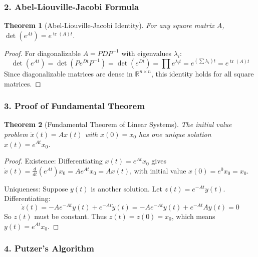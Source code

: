 \documentclass[12pt,a4paper,oneside]{article}
\theoremstyle{definition}
\theoremstyle{plain}
\newtheorem{theorem}{Theorem}[section]
\begin{document}
\subsubsection{2. Abel-Liouville-Jacobi Formula}

\vspace{0.15cm}
\begin{theorem}[Abel-Liouville-Jacobi Identity]
For any square matrix $A$, $\det(e^{At}) = e^{\operatorname{tr}(A) t}$.
\end{theorem}

\begin{proof}
For diagonalizable $A = P D P^{-1}$ with eigenvalues $\lambda_i$:
\begin{equation}
    \det(e^{At}) = \det(P e^{Dt} P^{-1}) = \det(e^{Dt}) = \prod e^{\lambda_i t} = e^{(\sum \lambda_i) t} = e^{\operatorname{tr}(A) t}
\end{equation}
Since diagonalizable matrices are dense in $\mathbb{R}^{n \times n}$, this identity holds for all square matrices.
\end{proof}

\subsubsection{3. Proof of Fundamental Theorem}

\vspace{0.15cm}
\begin{theorem}[Fundamental Theorem of Linear Systems]
The initial value problem $\dot{x}(t) = A x(t)$ with $x(0) = x_0$ has one unique solution $x(t) = e^{At} x_0$.
\end{theorem}

\begin{proof}
Existence: Differentiating $x(t) = e^{At} x_0$ gives $\dot{x}(t) = \frac{d}{dt}(e^{At}) x_0 = A e^{At} x_0 = A x(t)$, with initial value $x(0) = e^0 x_0 = x_0$.

Uniqueness: Suppose $y(t)$ is another solution. Let $z(t) = e^{-At} y(t)$. Differentiating:
\begin{equation}
    \dot{z}(t) = -A e^{-At} y(t) + e^{-At} \dot{y}(t) = -A e^{-At} y(t) + e^{-At} A y(t) = 0
\end{equation}
So $z(t)$ must be constant. Thus $z(t) = z(0) = x_0$, which means $y(t) = e^{At} x_0$.
\end{proof}

\subsubsection{4. Putzer's Algorithm}
\end{document}
